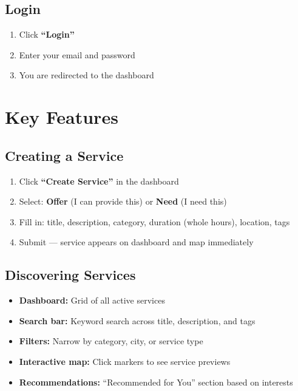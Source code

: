 \documentclass[10pt,a4paper]{report}
\begin{document}
\subsection{Login}

\begin{enumerate}
    \item Click \textbf{``Login''}
    \item Enter your email and password
    \item You are redirected to the dashboard
\end{enumerate}

\section{Key Features}

\subsection{Creating a Service}

\begin{enumerate}
    \item Click \textbf{``Create Service''} in the dashboard
    \item Select: \textbf{Offer} (I can provide this) or \textbf{Need} (I need this)
    \item Fill in: title, description, category, duration (whole hours), location, tags
    \item Submit --- service appears on dashboard and map immediately
\end{enumerate}

\subsection{Discovering Services}

\begin{itemize}
    \item \textbf{Dashboard:} Grid of all active services
    \item \textbf{Search bar:} Keyword search across title, description, and tags
    \item \textbf{Filters:} Narrow by category, city, or service type
    \item \textbf{Interactive map:} Click markers to see service previews
    \item \textbf{Recommendations:} ``Recommended for You'' section based on interests
\end{itemize}
\end{document}
